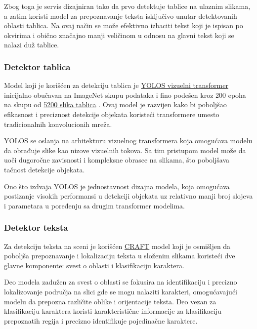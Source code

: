 \documentclass[a4paper,12pt]{article}
\begin{document}
	Zbog toga je servis dizajniran tako da prvo detektuje tablice na ulaznim slikama, a zatim koristi model za prepoznavanje teksta isključivo unutar detektovanih oblasti tablica. Na ovaj način se može efektivno izbaciti tekst koji je ispisan po okvirima i obično značajno manji veličinom u odnosu na glavni tekst koji se nalazi duž tablice.
	
	\subsubsection{Detektor tablica}
	Model koji je korišćen za detekciju tablica je \href{https://huggingface.co/nickmuchi/yolos-small-finetuned-license-plate-detection}{YOLOS vizuelni transformer} \cite{fang2021looksequencerethinkingtransformer} inicijalno obučavan na ImageNet skupu podataka i fino podešen kroz 200 epoha na skupu od \href{https://universe.roboflow.com/objectdetection-jhgr1/license-plates-recognition/dataset/2}{5200 slika tablica} \cite{LicensePlatesRecognitionDatasetRoboflow}. Ovaj model je razvijen kako bi poboljšao efikasnost i preciznost detekcije objekata koristeći transformere umesto tradicionalnih konvolucionih mreža.
	
	YOLOS se oslanja na arhitekturu vizuelnog transformera koja omogućava modelu da obrađuje slike kao nizove vizuelnih tokova. Sa tim pristupom model može da uoči dugoročne zavisnosti i kompleksne obrasce na slikama, što poboljšava tačnost detekcije objekata.
	
	Ono što izdvaja YOLOS je jednostavnost dizajna modela, koja omogućava postizanje visokih performansi u detekciji objekata uz relativno manji broj slojeva i parametara u poređenju sa drugim transformer modelima.
	
	\subsubsection{Detektor teksta}
	Za detekciju teksta na sceni je korišćen \href{https://github.com/clovaai/CRAFT-pytorch?tab=readme-ov-file}{CRAFT} model \cite{baek2019characterregionawarenesstext} koji je osmišljen da poboljša prepoznavanje i lokalizaciju teksta u složenim slikama koristeći dve glavne komponente: svest o oblasti i klasifikaciju karaktera.
	
	Deo modela zadužen za svest o oblasti se fokusira na identifikaciju i precizno lokalizovanje područja na slici gde se mogu nalaziti karakteri, omogućavajući modelu da prepozna različite oblike i orijentacije teksta. Deo vezan za klasifikaciju karaktera koristi karakteristične informacije za klasifikaciju prepoznatih regija i precizno identifikuje pojedinačne karaktere.
	
\end{document}
